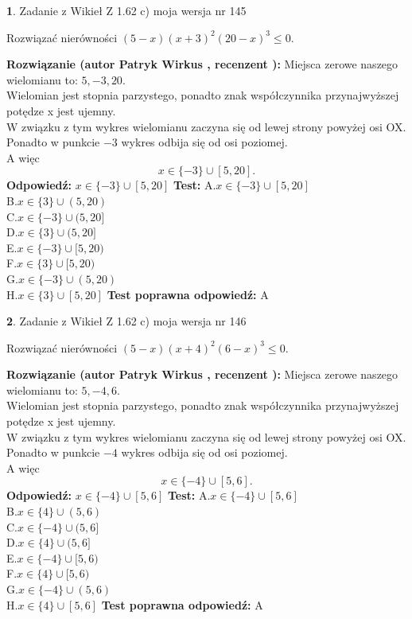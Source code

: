 \documentclass[12pt, a4paper]{article}
\theoremstyle{definition} %
\newtheorem{zad}{}
\newcommand{\zadStart}[1]{\begin{zad}#1\newline}
\newcommand{\zadStop}{\end{zad}}
\newcommand{\rozwStart}[2]{\noindent \textbf{Rozwiązanie (autor #1 , recenzent #2): }\newline}
\newcommand{\rozwStop}{\newline}
\newcommand{\odpStart}{\noindent \textbf{Odpowiedź:}\newline}
\newcommand{\odpStop}{\newline}
\newcommand{\testStart}{\noindent \textbf{Test:}\newline}
\newcommand{\testStop}{\newline}
\newcommand{\kluczStart}{\noindent \textbf{Test poprawna odpowiedź:}\newline}
\newcommand{\kluczStop}{\newline}
\begin{document}
\zadStart{Zadanie z Wikieł Z 1.62 c) moja wersja nr 145}

Rozwiązać nierówności $(5-x)(x+3)^{2}(20-x)^{3}\le0$.
\zadStop
\rozwStart{Patryk Wirkus}{}
Miejsca zerowe naszego wielomianu to: $5, -3, 20$.\\
Wielomian jest stopnia parzystego, ponadto znak współczynnika przy\linebreak najwyższej potędze x jest ujemny.\\ W związku z tym wykres wielomianu zaczyna się od lewej strony powyżej osi OX.\\
Ponadto w punkcie $-3$ wykres odbija się od osi poziomej.\\
A więc $$x \in \{-3\} \cup [5,20].$$
\rozwStop
\odpStart
$x \in \{-3\} \cup [5,20]$
\odpStop
\testStart
A.$x \in \{-3\} \cup [5,20]$\\
B.$x \in \{3\} \cup (5,20)$\\
C.$x \in \{-3\} \cup (5,20]$\\
D.$x \in \{3\} \cup (5,20]$\\
E.$x \in \{-3\} \cup [5,20)$\\
F.$x \in \{3\} \cup [5,20)$\\
G.$x \in \{-3\} \cup (5,20)$\\
H.$x \in \{3\} \cup [5,20]$
\testStop
\kluczStart
A
\kluczStop



\zadStart{Zadanie z Wikieł Z 1.62 c) moja wersja nr 146}

Rozwiązać nierówności $(5-x)(x+4)^{2}(6-x)^{3}\le0$.
\zadStop
\rozwStart{Patryk Wirkus}{}
Miejsca zerowe naszego wielomianu to: $5, -4, 6$.\\
Wielomian jest stopnia parzystego, ponadto znak współczynnika przy\linebreak najwyższej potędze x jest ujemny.\\ W związku z tym wykres wielomianu zaczyna się od lewej strony powyżej osi OX.\\
Ponadto w punkcie $-4$ wykres odbija się od osi poziomej.\\
A więc $$x \in \{-4\} \cup [5,6].$$
\rozwStop
\odpStart
$x \in \{-4\} \cup [5,6]$
\odpStop
\testStart
A.$x \in \{-4\} \cup [5,6]$\\
B.$x \in \{4\} \cup (5,6)$\\
C.$x \in \{-4\} \cup (5,6]$\\
D.$x \in \{4\} \cup (5,6]$\\
E.$x \in \{-4\} \cup [5,6)$\\
F.$x \in \{4\} \cup [5,6)$\\
G.$x \in \{-4\} \cup (5,6)$\\
H.$x \in \{4\} \cup [5,6]$
\testStop
\kluczStart
A
\kluczStop
\end{document}
